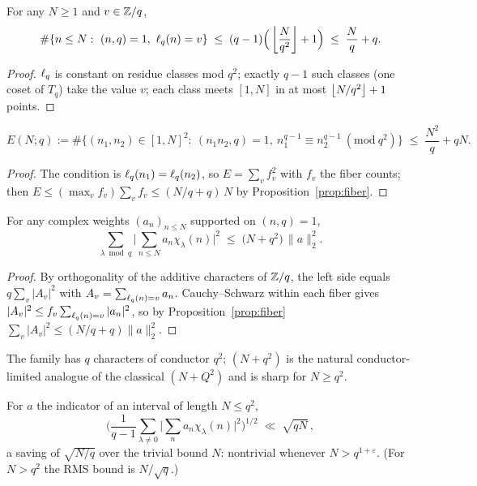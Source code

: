 \begin{proposition}\label{prop:fiber}
\statusPM\quad
For any $N\ge1$ and $v\in\mathbb{Z}/q$,
\[
\#\{n\le N:\ (n,q)=1,\ \ell_q(n)=v\}
\;\le\;(q-1)\Big(\left\lfloor \frac{N}{q^2}\right\rfloor+1\Big)
\;\le\;\frac Nq+q .
\]
\end{proposition}

\begin{proof}
$\ell_q$ is constant on residue classes mod $q^2$; exactly $q-1$ such classes
(one coset of $T_q$) take the value $v$; each class meets $[1,N]$ in at
most $\left\lfloor N/q^2\right\rfloor+1$ points.
\end{proof}

\begin{proposition}\label{prop:energy}
\statusPM\quad
\[
E(N;q):=\#\Big\{(n_1,n_2)\in[1,N]^2:\ (n_1n_2,q)=1,\
n_1^{q-1}\equiv n_2^{q-1}\ (\mathrm{mod}\ q^2)\Big\}
\;\le\;\frac{N^2}{q}+qN .
\]
\end{proposition}

\begin{proof}
The condition is $\ell_q(n_1)=\ell_q(n_2)$, so $E=\sum_vf_v^2$ with $f_v$ the
fiber counts; then
$E\le(\max_vf_v)\sum_vf_v\le(N/q+q)\,N$ by
Proposition~\ref{prop:fiber}.
\end{proof}

\begin{theorem}\label{thm:dls}
\statusPM\quad
For any complex weights $(a_n)_{n\le N}$ supported on $(n,q)=1$,
\[
\sum_{\lambda\bmod q}\Big|\sum_{n\le N}a_n\chi_\lambda(n)\Big|^2
\;\le\;\big(N+q^2\big)\,\|a\|_2^2 .
\]
\end{theorem}

\begin{proof}
By orthogonality of the additive characters of $\mathbb{Z}/q$, the left side
equals $q\sum_{v}|A_v|^2$ with $A_v=\sum_{\ell_q(n)=v}a_n$. Cauchy--Schwarz
within each fiber gives $|A_v|^2\le f_v\sum_{\ell_q(n)=v}|a_n|^2$, so by
Proposition~\ref{prop:fiber}
$\sum_v|A_v|^2\le(N/q+q)\|a\|_2^2$.
\end{proof}

\begin{remark}
The family has $q$ characters of conductor $q^2$; $(N+q^2)$ is the natural
conductor-limited analogue of the classical $(N+Q^2)$ and is sharp for
$N\ge q^2$.
\end{remark}

\begin{corollary}\label{cor:rms}
\statusPM\quad
For $a$ the indicator of an interval of length $N\le q^2$,
\[
\Big(\frac{1}{q-1}\sum_{\lambda\ne0}\Big|\sum_{n}a_n\chi_\lambda(n)\Big|^2\Big)^{1/2}
\;\ll\;\sqrt{qN}\,,
\]
a saving of $\sqrt{N/q}$ over the trivial bound $N$: nontrivial whenever
$N>q^{1+\varepsilon}$. (For $N>q^2$ the RMS bound is $N/\sqrt q$.)
\end{corollary}

